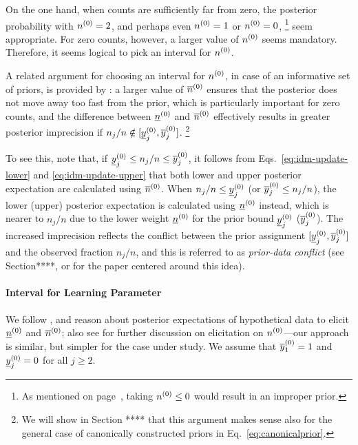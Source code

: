 On the one hand, when counts are sufficiently far from zero,
the posterior probability with $n^{(0)}=2$, and perhaps even $n^{(0)}=1$ or $n^{(0)}=0$,%
\footnote{As mentioned on page~\pageref{eq:canonicalprior},
taking $n^{(0)} \le 0$ would result in an improper prior.}
seem appropriate.
For zero counts, however, a larger value of $n^{(0)}$ seems mandatory.
Therefore, it seems logical to pick an interval for $n^{(0)}$.

A related argument for choosing an interval for $n^{(0)}$,
in case of an informative set of priors,
is provided by \textcite[p.~225, \S 5.4.4]{1991:walley}:
a larger value of $\overline{n}^{(0)}$ ensures that the posterior does not move away too fast from the prior,
which is particularly important for zero counts,
and the difference between $\underline{n}^{(0)}$ and $\overline{n}^{(0)}$ effectively results in greater posterior
imprecision if $n_j/n \notin [\underline{y}^{(0)}_j,\overline{y}^{(0)}_j]$.%
\footnote{We will show in Section **** that this argument makes sense
also for the general case of canonically constructed priors in Eq.~\eqref{eq:canonicalprior}.}

To see this, note that, if $\underline{y}^{(0)}_j \le n_j/n \le \overline{y}^{(0)}_j$, it follows from
Eqs.~\eqref{eq:idm-update-lower} and \eqref{eq:idm-update-upper}
that both lower and upper posterior expectation are calculated using $\overline{n}^{(0)}$.
When $n_j/n \le \underline{y}^{(0)}_j$ (or $\overline{y}^{(0)}_j \le n_j/n$),
the lower (upper) posterior expectation is calculated using $\underline{n}^{(0)}$ instead,
which is nearer to $n_j/n$ due to the lower weight $\underline{n}^{(0)}$ for the prior bound $\underline{y}^{(0)}_j$ ($\overline{y}^{(0)}_j$).
The increased imprecision reflects the conflict between the prior assignment
$[\underline{y}^{(0)}_j,\overline{y}^{(0)}_j]$ and the observed fraction $n_j/n$,
and this is referred to as \emph{prior-data conflict}
(see Section****, or \textcite{Walter2009a} for the paper centered around this idea).

\paragraph{Interval for Learning Parameter}

We follow \textcite[p.~19]{1965:good} \parencite[as suggested by][Note~5.4.1, p.~524]{1991:walley},
and reason about posterior expectations of hypothetical data to elicit $\underline{n}^{(0)}$ and $\overline{n}^{(0)}$;
also see \textcite[p.~219, \S 5.3.3]{1991:walley} for further
discussion on elicitation on $n^{(0)}$---our approach is similar, but simpler for the case under study.
We assume that $\overline{y}^{(0)}_1=1$ and $\underline{y}^{(0)}_j=0$ for all $j\ge 2$.

